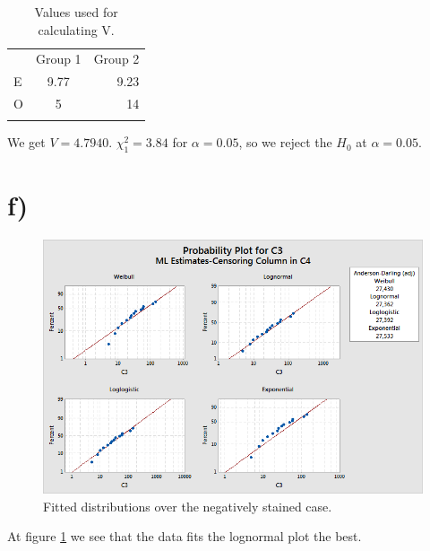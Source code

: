\documentclass[10pt, a4paper]{article}
\begin{document}
\begin{center}
\begin{table}
\centering
\begin{tabular}{ l c r }

   & Group 1 & Group 2 \\
  E & 9.77 & 9.23 \\
  O & 5 & 14 \\
  \caption{Values used for calculating V.}
  \label{V}
\end{tabular}
\end{table}
\end{center}

We get $V = 4.7940 $. $\chi^2_1=3.84$ for $\alpha = 0.05$, so we reject the $H_0$ at $ \alpha = 0.05 $.

\section*{f)}

\begin{center}
\begin{figure}[h!]
\centering
\includegraphics[scale=0.75]{pos.png}
\caption{Fitted distributions over the negatively stained case.}
\label{pos}
\end{figure}
\end{center}
At figure \ref{pos} we see that the data fits the lognormal plot the best. 
\end{document}
